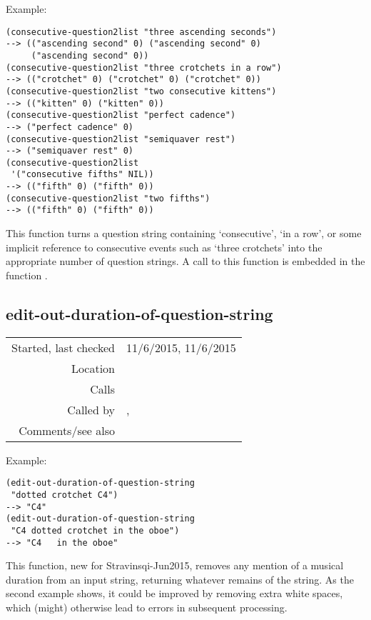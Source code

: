 \vspace{0.5cm}
\noindent Example:
\begin{verbatim}
(consecutive-question2list "three ascending seconds")
--> (("ascending second" 0) ("ascending second" 0)
     ("ascending second" 0))
(consecutive-question2list "three crotchets in a row")
--> (("crotchet" 0) ("crotchet" 0) ("crotchet" 0))
(consecutive-question2list "two consecutive kittens")
--> (("kitten" 0) ("kitten" 0))
(consecutive-question2list "perfect cadence")
--> ("perfect cadence" 0)
(consecutive-question2list "semiquaver rest")
--> ("semiquaver rest" 0)
(consecutive-question2list
 '("consecutive fifths" NIL))
--> (("fifth" 0) ("fifth" 0))
(consecutive-question2list "two fifths")
--> (("fifth" 0) ("fifth" 0))
\end{verbatim}

\noindent This function turns a question string
containing `consecutive', `in a row', or some
implicit reference to consecutive events such as
`three crotchets' into the appropriate number of
question strings. A call to this function is
embedded in the function
.


\subsection*{edit-out-duration-of-question-string}\label{fun:edit-out-duration-of-question-string}

\vspace{0.3cm}
\begin{tabular}{r|p{8cm}}
Started, last checked & 11/6/2015, 11/6/2015 \\
Location & \nameref{sec:analytic-string-manipulations} \\
Calls & \\
Called by & \nameref{fun:duration-and-pitch-class-time-intervals}, \nameref{fun:duration-and-time-intervals} \\
Comments/see also &
\end{tabular}

\vspace{0.5cm}
\noindent Example:
\begin{verbatim}
(edit-out-duration-of-question-string
 "dotted crotchet C4")
--> "C4"
(edit-out-duration-of-question-string
 "C4 dotted crotchet in the oboe")
--> "C4   in the oboe"
\end{verbatim}

\noindent This function, new for Stravinsqi-Jun2015,
removes any mention of a musical duration from an input
string, returning whatever remains of the string. As the
second example shows, it could be improved by removing
extra white spaces, which (might) otherwise lead to
errors in subsequent processing.


